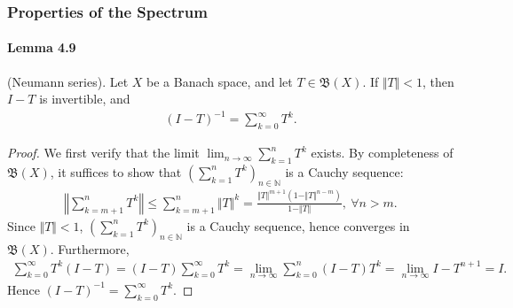 \documentclass{article}
\begin{document}
\subsubsection{Properties of the Spectrum}
\paragraph{Lemma 4.9\label{lemma:4.9}} (Neumann series). Let $X$ be a Banach space, and let $T\in\mathfrak{B}(X)$. If $\Vert T\Vert < 1$, then $I-T$ is invertible, and
\begin{align*}
	(I-T)^{-1}= \sum_{k=0}^\infty T^k.
\end{align*}
\begin{proof}
We first verify that the limit $\lim_{n\to\infty}\sum_{k=1}^n T^k$ exists. By completeness of $\mathfrak{B}(X)$, it suffices to show that $\left(\sum_{k=1}^n T^k\right)_{n\in\mathbb{N}}$ is a Cauchy sequence:
\begin{align*}
	\left\Vert\sum_{k=m+1}^n T^k\right\Vert\leq\sum_{k=m+1}^n \Vert T\Vert^k = \frac{\Vert T\Vert^{m+1}(1-\Vert T\Vert^{n-m})}{1-\Vert T\Vert},\ \forall n>m.
\end{align*}
Since $\Vert T\Vert <1$, $\left(\sum_{k=1}^n T^k\right)_{n\in\mathbb{N}}$ is a Cauchy sequence, hence converges in $\mathfrak{B}(X)$. Furthermore,
\begin{align*}
	\sum_{k=0}^\infty T^k(I-T) = (I-T)\sum_{k=0}^\infty T^k = \lim_{n\to\infty} \sum_{k=0}^n(I-T)T^k = \lim_{n\to\infty} I-T^{n+1} = I.
\end{align*}
Hence $(I-T)^{-1}=\sum_{k=0}^\infty T^k$.
\end{proof}
\end{document}
